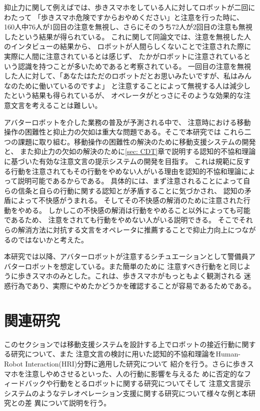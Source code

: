 \documentclass{kuisthesis}
\begin{document}
抑止力に関して例えば\cite{Schneider2022}では、歩きスマホをしている人に対してロボットが二回にわたって
「歩きスマホ危険ですからおやめください」と注意を行った時に、
160人中76人が1回目の注意を無視し、さらにそのうち72人が2回目の注意も無視したという結果が得られている。
これに関して同論文では、注意を無視した人のインタビューの結果から、
ロボットが人間らしくないことで注意された際に実際に人間に注意されているとは感じず、
たかがロボットに注意されているという認識を持つことが多いためであると考察されている。
一回目の注意を無視した人に対して、「あなたはただのロボットだとお思いみたいですが、私はみんなのために働いているのですよ」
と注意することによって無視する人は減少したという結果も得られているが、
オペレータがとっさにそのような効果的な注意文言を考えることは難しい。

アバターロボットを介した業務の普及が予測される中で、
注意時における移動操作の困難性と抑止力の欠如は重大な問題である。そこで本研究では
これら二つの課題に取り組む。移動操作の困難性の解決のために移動支援システムの開発と、
また抑止力の欠如の解決のために\ref{sec: CDT}章で説明する認知的不協和理論\cite{Festinger1957}に基づいた有効な注意文言の提示システムの開発を目指す。
これは規範に反する行動を注意されてもその行動をやめない人がいる理由を認知的不協和理論によって説明可能であるからである。
具体的には、まず注意されることによって自らの信条と自らの行動に関する認知とが矛盾することに気づかされ、
認知の矛盾によって不快感がうまれる。
そしてその不快感の解消のために注意された行動をやめる。
しかしこの不快感の解消は行動をやめること以外によっても可能であるため、
注意をされても行動をやめない人がいる説明できる。
そこでそれらの解消方法に対抗する文言をオペレータに推薦することで抑止力向上につながるのではないかと考えた。

本研究では以降、アバターロボットが注意するシチュエーションとして警備員アバターロボットを想定している。また簡単のために
注意すべき行動を\cite{Schneider2022,Mizumaru2019}と同じように歩きスマホのみとした。これは、歩きスマホがもっともよく観測される
迷惑行為であり、実際にやめたかどうかを確認することが容易であるためである。



\section{関連研究}
このセクションでは移動支援システムを設計する上でロボットの接近行動に関する研究について、また
注意文言の検討に用いた認知的不協和理論をHuman-Robot Interaction(HRI)分野に適用した研究について
紹介を行う。さらに歩きスマホを注意しやめさせるといった、人の行動に影響を与えるた
めに否定的なフィードバックや行動をとるロボットに関する研究についてそして
注意文言提示システムのようなテレオペレーション支援に関する研究について様々な例と本研究との差
異について説明を行う。
\end{document}
